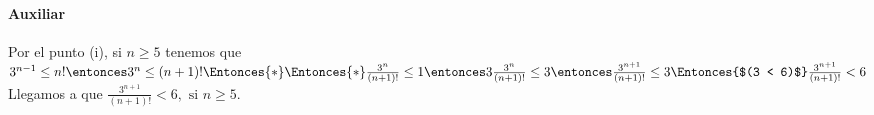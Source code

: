 \begin{enumerate}[label=\roman*)]
        \paragraph{Auxiliar}{Por el punto (i), si $n \geq 5$ tenemos que $3^{n-1} \leq n! \entonces 3^{n} \leq
            (n+1)! \Entonces{*} \\
            \Entonces{*}  \frac{3^n}{(n+1)!} \leq 1 \entonces 3\frac{3^n}{(n+1)!} \leq 3 \entonces
            \frac{3^{n+1}}{(n+1)!} \leq 3 \Entonces{$(3 < 6)$} \frac{3^{n+1}}{(n+1)!} < 6 $\\
          Llegamos a que $ \frac{3^{n+1}}{(n+1)!} < 6, \text{ si } n \geq 5$.}
\end{enumerate}
